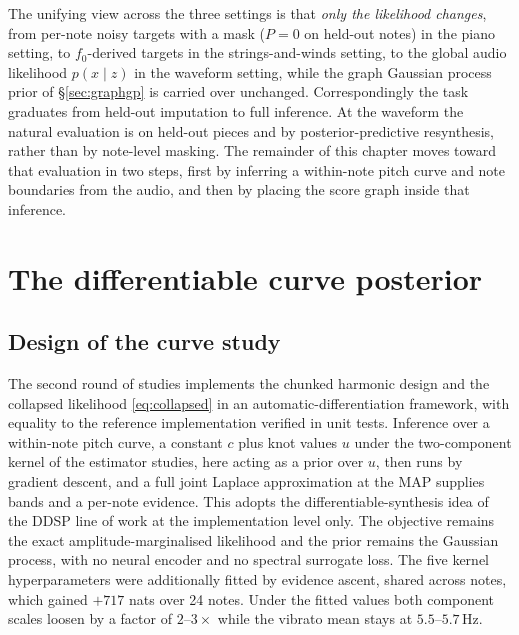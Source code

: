 The unifying view across the three settings is that \emph{only the
likelihood changes}, from per-note noisy targets with a mask ($P = 0$ on
held-out notes) in the piano setting, to $f_0$-derived targets in the
strings-and-winds setting, to the global audio likelihood $p(x \mid z)$ in
the waveform setting, while the graph Gaussian process prior of
\S\ref{sec:graphgp} is carried over unchanged. Correspondingly the task
graduates from held-out imputation to full inference. At the waveform the
natural evaluation is on held-out pieces and by posterior-predictive
resynthesis, rather than by note-level masking. The remainder of this
chapter moves toward that evaluation in two steps, first by inferring a
within-note pitch curve and note boundaries from the audio, and then by
placing the score graph inside that inference.

\section{The differentiable curve posterior}
\label{sec:phase3-curve}

\subsection{Design of the curve study}

The second round of studies implements the chunked harmonic design and the
collapsed likelihood \eqref{eq:collapsed} in an automatic-differentiation
framework, with equality to the reference implementation verified in unit
tests. Inference over a within-note pitch curve, a constant $c$ plus knot
values $u$ under the two-component kernel of the estimator studies, here
acting as a prior over $u$, then runs by gradient descent, and a full joint
Laplace approximation at the MAP supplies bands and a per-note evidence.
This adopts the differentiable-synthesis idea of the DDSP line of work
\cite{ddsp} at the implementation level only. The objective remains the
exact amplitude-marginalised likelihood and the prior remains the Gaussian
process, with no neural encoder and no spectral surrogate loss. The five
kernel hyperparameters were additionally fitted by evidence ascent, shared
across notes, which gained $+717$ nats over 24 notes. Under the fitted
values both component scales loosen by a factor of $2$--$3\times$ while the
vibrato mean stays at $5.5$--$5.7$\,Hz.


